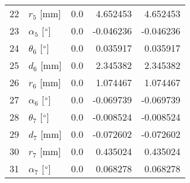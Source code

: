 \documentclass{standalone}%
\begin{document}
\begin{tabular}{llrrr}
22 &              $r_{5}$ [mm] &       0.0 &   4.652453 &   4.652453 \\
23 &  $\alpha_{5}$ [$\degree$] &       0.0 &  -0.046236 &  -0.046236 \\
24 &  $\theta_{6}$ [$\degree$] &       0.0 &   0.035917 &   0.035917 \\
25 &              $d_{6}$ [mm] &       0.0 &   2.345382 &   2.345382 \\
26 &              $r_{6}$ [mm] &       0.0 &   1.074467 &   1.074467 \\
27 &  $\alpha_{6}$ [$\degree$] &       0.0 &  -0.069739 &  -0.069739 \\
28 &  $\theta_{7}$ [$\degree$] &       0.0 &  -0.008524 &  -0.008524 \\
29 &              $d_{7}$ [mm] &       0.0 &  -0.072602 &  -0.072602 \\
30 &              $r_{7}$ [mm] &       0.0 &   0.435024 &   0.435024 \\
31 &  $\alpha_{7}$ [$\degree$] &       0.0 &   0.068278 &   0.068278 \\
\bottomrule
\end{tabular}
%
\end{document}
